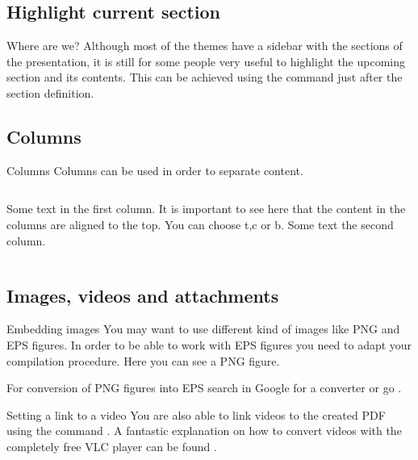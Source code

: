 \documentclass[handout]{beamer}
\begin{document}
\subsection{Highlight current section}
\begin{frame}{Where are we?}
Although most of the themes have a sidebar with the sections of the presentation, it is still for some people very useful to highlight the upcoming section and its contents. \pause
This can be achieved using the command  just after the section definition.
\end{frame}


\subsection{Columns}
\begin{frame}{Columns}
Columns can be used in order to separate content. \\[1cm]
\begin{columns}[t]
	Some text in the first column. It is important to see here that the content in the columns are aligned to the top. You can choose t,c or b.
	Some text the second column.
\end{columns}
\end{frame}


\subsection{Images, videos and attachments}
\begin{frame}{Embedding images}
You may want to use different kind of images like PNG and EPS figures. In order to be able to work with EPS figures you need to adapt your compilation procedure. Here you can see a PNG figure.
\begin{center}
\end{center}
For conversion of PNG figures into EPS search in Google for a converter or go .
\end{frame}


\begin{frame}{Setting a link to a video}
You are also able to link videos to the created PDF using the command .
A fantastic explanation on how to convert videos with the completely free VLC player can be found .
\end{frame}
\end{document}
